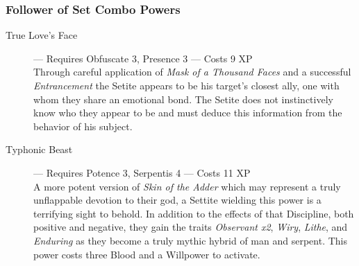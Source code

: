 \subsubsection{Follower of Set Combo Powers}
\begin{description}
	\item[True Love's Face]--- Requires Obfuscate 3, Presence 3 --- Costs 9 XP \\
	Through careful application of \emph{Mask of a Thousand Faces} and a successful \emph{Entrancement} 
	the Setite appears to be his target's closest ally, one with whom they share an emotional bond.  
	The Setite does not instinctively know who they appear to be and must deduce this information 
	from the behavior of his subject.
	\item[Typhonic Beast]--- Requires Potence 3, Serpentis 4 --- Costs 11 XP \\
	A more potent version of \emph{Skin of the Adder} which may represent a truly unflappable 
	devotion to their god, a Settite wielding this power is a terrifying sight to behold.  In 
	addition to the effects of that Discipline, both positive and negative, they gain the 
	traits \emph{Observant x2}, \emph{Wiry}, \emph{Lithe}, and \emph{Enduring} as they become 
	a truly mythic hybrid of man and serpent.  This power costs three Blood and a Willpower to 
	activate.
\end{description}

